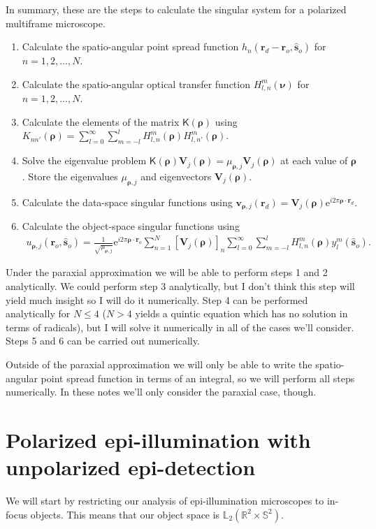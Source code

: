 \documentclass[11pt]{article}
\newcommand{\me}{\mathrm{e}}
\providecommand{\mb}[1]{\mathbf{#1}}
\providecommand{\ro}[1]{\mathbf{\mathbf{r}}_o}
\providecommand{\so}[1]{\mathbf{\hat{s}}_o}
\providecommand{\rd}[1]{\mathbf{r}_d}
\providecommand{\mbb}[1]{\mathbb{#1}}
\providecommand{\bs}[1]{\boldsymbol{#1}}
\begin{document}
In summary, these are the steps to calculate the singular system for a
polarized multiframe microscope.
\begin{enumerate}
\item Calculate the spatio-angular point spread function
  $h_n(\rd{} - \ro{}, \so{})$ for $n = 1, 2, \ldots, N$.
\item Calculate the spatio-angular optical transfer function
  $H_{l,n}^{m}(\bs{\nu})$ for $n = 1, 2, \ldots, N$.
\item Calculate the elements of the matrix $\mathsf{K}(\bs{\rho})$ using
  $K_{nn'}(\bs{\rho}) = \sum_{l=0}^{\infty}\sum_{m=-l}^l H_{l,n}^m(\bs{\rho}) H_{l,n'}^m(\bs{\rho})$.
\item Solve the eigenvalue problem
  $\mathsf{K}(\bs{\rho})\mb{V}_j(\bs{\rho}) = \mu_{\bs{\rho}, j}\mb{V}_j(\bs{\rho})$ at each value of $\bs{\rho}$. Store the eigenvalues $\mu_{\bs{\rho}, j}$ and eigenvectors $\mb{V}_j(\bs{\rho})$. 
\item Calculate the data-space singular functions using $\mb{v}_{\bs{\rho},j}(\rd{}) = \mb{V}_j(\bs{\rho})\me{}^{i 2\pi \bs{\rho}\cdot\rd{}}$.
\item Calculate the object-space singular functions using
  \begin{align}
   u_{\bs{\rho},j}(\ro{}, \so{}) = \frac{1}{\sqrt{\mu_{\bs{\rho},j}}}\me{}^{i2\pi\bs{\rho}\cdot\ro{}}\sum_{n=1}^N[\mb{V}_j(\bs{\rho})]_n \sum_{l=0}^{\infty}\sum_{m=-l}^l H_{l,n}^m(\bs{\rho})y_l^m(\so{}). 
  \end{align}
\end{enumerate}

Under the paraxial approximation we will be able to perform steps 1 and 2
analytically. We could perform step 3 analytically, but I don't think this step
will yield much insight so I will do it numerically. Step 4 can be performed
analytically for $N \leq 4$ ($N > 4$ yields a quintic equation which has no
solution in terms of radicals), but I will solve it numerically in all of the
cases we'll consider. Steps 5 and 6 can be carried out numerically.

Outside of the paraxial approximation we will only be able to write the
spatio-angular point spread function in terms of an integral, so we will
perform all steps numerically. In these notes we'll only consider the paraxial
case, though.

\section{Polarized epi-illumination with unpolarized epi-detection}
We will start by restricting our analysis of epi-illumination microscopes to
in-focus objects. This means that our object space is
$\mbb{L}_2(\mbb{R}^2 \times \mbb{S}^2)$.
\end{document}
